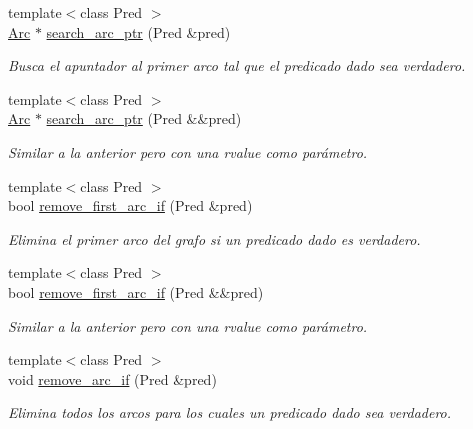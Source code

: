 \begin{DoxyCompactItemize}
{\footnotesize template$<$class Pred $>$ }\\\hyperlink{namespace_designar_a3f55fb5513d62ff47cbc8f72b8e95d6f}{Arc} $\ast$ \hyperlink{class_designar_1_1_base_graph_a27d1effa356e6570ddca3c71559e7eb7}{search\+\_\+arc\+\_\+ptr} (Pred \&pred)
\begin{DoxyCompactList}\small\item\em Busca el apuntador al primer arco tal que el predicado dado sea verdadero. \end{DoxyCompactList}\item 
{\footnotesize template$<$class Pred $>$ }\\\hyperlink{namespace_designar_a3f55fb5513d62ff47cbc8f72b8e95d6f}{Arc} $\ast$ \hyperlink{class_designar_1_1_base_graph_a6d7036b2c4b78dcc46de3fc0d314b871}{search\+\_\+arc\+\_\+ptr} (Pred \&\&pred)
\begin{DoxyCompactList}\small\item\em Similar a la anterior pero con una rvalue como parámetro. \end{DoxyCompactList}\item 
{\footnotesize template$<$class Pred $>$ }\\bool \hyperlink{class_designar_1_1_base_graph_ae45255ef62c056e76c5e5c45182e9490}{remove\+\_\+first\+\_\+arc\+\_\+if} (Pred \&pred)
\begin{DoxyCompactList}\small\item\em Elimina el primer arco del grafo si un predicado dado es verdadero. \end{DoxyCompactList}\item 
{\footnotesize template$<$class Pred $>$ }\\bool \hyperlink{class_designar_1_1_base_graph_a990426c9e87f922bbbd0c9bc4d2cedd8}{remove\+\_\+first\+\_\+arc\+\_\+if} (Pred \&\&pred)
\begin{DoxyCompactList}\small\item\em Similar a la anterior pero con una rvalue como parámetro. \end{DoxyCompactList}\item 
{\footnotesize template$<$class Pred $>$ }\\void \hyperlink{class_designar_1_1_base_graph_a9c97f2759a2847e61e17dc2806172758}{remove\+\_\+arc\+\_\+if} (Pred \&pred)
\begin{DoxyCompactList}\small\item\em Elimina todos los arcos para los cuales un predicado dado sea verdadero. \end{DoxyCompactList}\item 

\end{DoxyCompactItemize}
